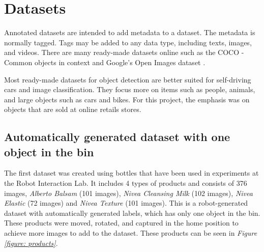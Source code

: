 \clearpage
\section{Datasets}
Annotated datasets are intended to add metadata to a dataset. The metadata is normally tagged. Tags may be added to any data type, including texts, images, and videos. There are many ready-made datasets online such as the COCO - Common objects in context \cite{noauthor_what_nodate} and Google’s Open Images dataset \cite{noauthor_open_nodate}.

Most ready-made datasets for object detection are better suited for self-driving cars and image classification. They focus more on items such as people, animals, and large objects such as cars and bikes. For this project, the emphasis was on objects that are sold at online retails stores.

\subsection{Automatically generated dataset with one object in the bin} \label{sec:firstdataset}
The first dataset was created using bottles that have been used in experiments at the Robot Interaction Lab. It includes 4 types of products and consists of 376 images, \textit{Alberto Balsam} (101 images), \textit{Nivea Cleansing Milk} (102 images), \textit{Nivea Elastic} (72 images) and \textit{Nivea Texture} (101 images). 
This is a robot-generated dataset with automatically generated labels, which has only one object in the bin. 
These products were moved, rotated, and captured in the home position to achieve more images to add to the dataset. 
These products can be seen in \textit{Figure \ref{figure: products}}.

